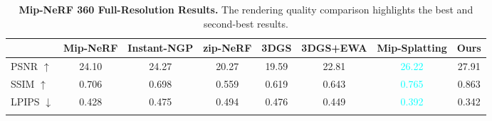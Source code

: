 \begin{table}[t]
    \centering
    \caption{\textbf{Mip-NeRF 360 Full-Resolution Results.} The rendering quality comparison highlights the best and second-best results.}
    \label{tab:mipnerf_transposed}
    \setlength{\tabcolsep}{5pt}
    \begin{tabular}{@{}lccccccc@{}}
    \toprule
    & Mip-NeRF & Instant-NGP & zip-NeRF & 3DGS & 3DGS+EWA & Mip-Splatting & \textbf{Ours} \\
    \midrule
    PSNR $\uparrow$     & 24.10 & 24.27 & 20.27 & 19.59 & 22.81 & \textcolor{cyan}{26.22} & \textcolor{BurntOrange}{27.91} \\
    SSIM $\uparrow$     & 0.706 & 0.698 & 0.559 & 0.619 & 0.643 & \textcolor{cyan}{0.765} & \textcolor{BurntOrange}{0.863} \\
    LPIPS $\downarrow$  & 0.428 & 0.475 & 0.494 & 0.476 & 0.449 & \textcolor{cyan}{0.392} & \textcolor{BurntOrange}{0.342} \\
    \bottomrule
    \vspace{-0.4cm}
    \end{tabular}
    \label{tab1}
\end{table}




